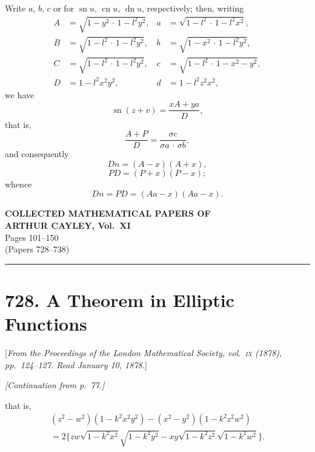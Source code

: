 \documentclass[11pt,a4paper]{book}
\begin{document}
Write $a$, $b$, $c$ or for $\operatorname{sn} u$, $\operatorname{cn} u$, $\operatorname{dn} u$, respectively; then, writing
\begin{align*}
A&=\sqrt{1-y^2\,\cdot\,1-l^2 y^2},& a&=\sqrt{1-l^2\,\cdot\,1-l^2 x^2},\\
B&=\sqrt{1-l^2\,\cdot\,1-l^2 y^2},& b&=\sqrt{1-x^2\,\cdot\,1-l^2 y^2},\\
C&=\sqrt{1-l^2\,\cdot\,1-l^2 y^2},& c&=\sqrt{1-l^2\,\cdot\,1-x^2-y^2},\\
D&=1-l^2 x^2y^2,& d&=1-l^2 z^2 x^2,
\end{align*}
we have
\[
\operatorname{sn}(z+v)=\frac{x A+y a}{D},
\]
that is,
\[
\frac{A+P}{D}=\frac{\sigma c}{\sigma a\,\cdot\,\sigma b},
\]
and consequently
\[
Dn=(A-x)(A+x),
\]
\[
PD=(P+x)(P-x);
\]
whence
\[
Dn=PD=(Aa-x)(Aa-x).
\]
\clearpage


\begin{center}
{\Large\bfseries COLLECTED MATHEMATICAL PAPERS OF\\[4pt]
ARTHUR CAYLEY, Vol.~XI}\\[12pt]
{\large Pages 101--150}\\[8pt]
{\normalsize (Papers 728--738)}
\end{center}

\vspace{1em}
\hrule
\vspace{1.5em}

\section*{728. A Theorem in Elliptic Functions}

[\textit{From the Proceedings of the London Mathematical Society, vol.~\textsc{ix} (1878), pp.~124--127.
Read January 10, 1878.}]

\vspace{0.5em}
\noindent\textit{[Continuation from p.~77.]}

\vspace{0.5em}
\noindent
that is,
\begin{multline*}
(z^2-w^2)(1-k^2x^2y^2) - (x^2-y^2)(1-k^2z^2w^2) \\
= 2\{zw\sqrt{1-k^2x^2}\sqrt{1-k^2y^2} - xy\sqrt{1-k^2z^2}\sqrt{1-k^2w^2}\}.
\end{multline*}
\end{document}
